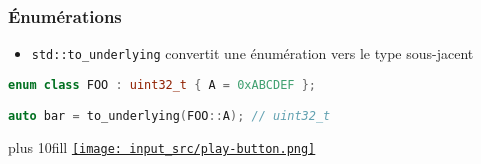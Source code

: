 \documentclass[C++.tex]{subfiles}
\begin{document}
\begin{frame}[fragile]
	\frametitle{Énumérations}
	\begin{itemize}
		\item \lstinline|std::to_underlying| convertit une énumération vers le type sous-jacent
	\end{itemize}

	\begin{lstlisting}[language=C++]
enum class FOO : uint32_t { A = 0xABCDEF };

auto bar = to_underlying(FOO::A); // uint32_t\end{lstlisting}

	\vskip 10mm plus 10fill
	\hfill
	\href{https://godbolt.org/#g:!((g:!((g:!((h:codeEditor,i:(filename:'1',fontScale:14,fontUsePx:'0',j:1,lang:c%2B%2B,selection:(endColumn:6,endLineNumber:17,positionColumn:6,positionLineNumber:17,selectionStartColumn:6,selectionStartLineNumber:17,startColumn:6,startLineNumber:17),source:'%23include+%3Ciostream%3E%0A%23include+%3Cutility%3E%0A%23include+%3Ccstdint%3E%0A%23include+%3Ctypeinfo%3E%0A%23include+%3Ccassert%3E%0A%0Aenum+class+FOO+:+uint32_t+%0A%7B+%0A++A+%3D+0xABCDEF,%0A%7D%3B%0A%0Aint+main()%0A%7B%0A++auto+bar+%3D+std::to_underlying(FOO::A)%3B%0A%0A++assert(typeid(bar)+%3D%3D+typeid(uint32_t))%3B%0A%23if+0%0A++assert(typeid(bar)+%3D%3D+typeid(int))%3B%0A%23endif%0A%7D%0A'),l:'5',n:'0',o:'C%2B%2B+source+%231',t:'0')),k:50,l:'4',n:'0',o:'',s:0,t:'0'),(g:!((h:executor,i:(argsPanelShown:'1',compilationPanelShown:'0',compiler:g122,compilerName:'',compilerOutShown:'0',execArgs:'',execStdin:'',fontScale:14,fontUsePx:'0',j:1,lang:c%2B%2B,libs:!((name:boost,ver:'175')),options:'-std%3Dc%2B%2B23+-Wall+-Wextra+-pedantic',source:1,stdinPanelShown:'1',tree:'1',wrap:'0'),l:'5',n:'0',o:'Executor+x86-64+gcc+12.2+(C%2B%2B,+Editor+%231)',t:'0')),header:(),k:50,l:'4',n:'0',o:'',s:0,t:'0')),l:'2',n:'0',o:'',t:'0')),version:4}{\texttt{[image: input\_src/play-button.png]}}
\end{frame}
\end{document}
